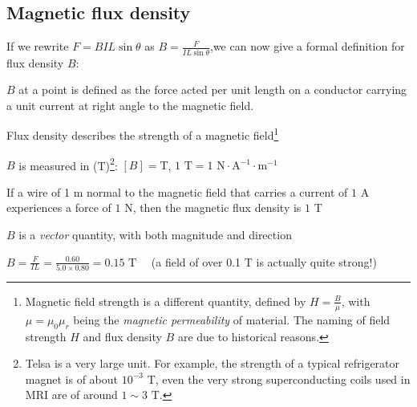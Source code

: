 \subsection{Magnetic flux density} \label{sec:magnetic_flux_density}

If we rewrite $F=BIL\sin\theta$ as $B = \frac{F}{IL\sin\theta}$,we can now give a formal definition for flux density $B$:

\begin{ilight}
	 $B$ at a point is defined as the force acted per unit length on a conductor carrying a unit current at right angle to the magnetic field.
\end{ilight}

Flux density describes the strength of a magnetic field\footnote{Magnetic field strength is a different quantity, defined by $H=\frac{B}{\mu}$, with $\mu=\mu_0\mu_r$ being the \emph{magnetic permeability} of material. The naming of field strength $H$ and flux density $B$ are due to historical reasons.}

\cmt $B$ is measured in  (T)\footnote{Telsa is a very large unit. For example, the strength of a typical refrigerator magnet is of about $10^{-3} \text{ T}$, even the very strong superconducting coils used in MRI are of around $1\sim3 \text{ T}$.}: $[B]=\text{T}$, $1 \text{ T} = 1 \text{ N}\cdot\text{A}^{-1}\cdot\text{m}^{-1}$

\begin{ilight}
	If a wire of 1 m normal to the magnetic field that carries a current of $1\text{ A}$ experiences a force of $1\text{ N}$, then the magnetic flux density is $1\text{ T}$
\end{ilight}

\cmt $B$ is a \emph{vector} quantity, with both magnitude and direction


	
\begin{soln} $B=\frac{F}{IL} = \frac{0.60}{5.0\times0.80} = 0.15 \text{ T} \quad $ (a field of over 0.1 T is actually quite strong!) \end{soln}


\newpage
{}

